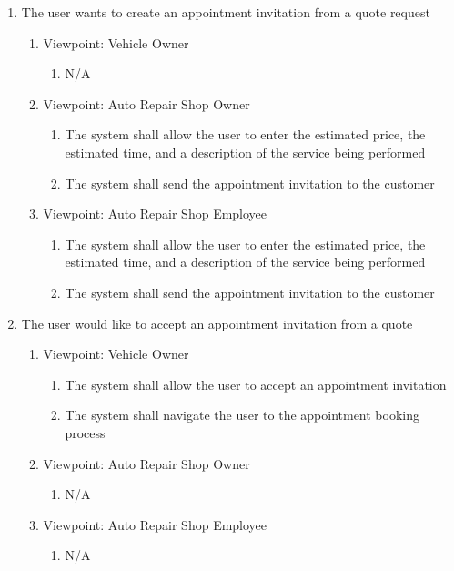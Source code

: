 \documentclass[12pt]{article}
\begin{document}
\begin{enumerate}[resume*=business_events]
	\item The user wants to create an appointment invitation from a quote request
	      \begin{enumerate}[VP\arabic*.]
		      \item Viewpoint: Vehicle Owner
		            \begin{enumerate}
			            \item[] N/A
		            \end{enumerate}
		      \item Viewpoint: Auto Repair Shop Owner
		            \begin{enumerate}
			            \item The system shall allow the user to enter the estimated price, the estimated time, and a description
			                  of the service being performed
			            \item The system shall send the appointment invitation to the customer
		            \end{enumerate}
		      \item Viewpoint: Auto Repair Shop Employee
		            \begin{enumerate}
			            \item The system shall allow the user to enter the estimated price, the estimated time, and a description
			                  of the service being performed
			            \item The system shall send the appointment invitation to the customer
		            \end{enumerate}
	      \end{enumerate}

	\item The user would like to accept an appointment invitation from a quote
	      \begin{enumerate}[VP\arabic*.]
		      \item Viewpoint: Vehicle Owner
		            \begin{enumerate}
			            \item The system shall allow the user to accept an appointment invitation
			            \item The system shall navigate the user to the appointment booking process
		            \end{enumerate}
		      \item Viewpoint: Auto Repair Shop Owner
		            \begin{enumerate}
			            \item[] N/A
		            \end{enumerate}
		      \item Viewpoint: Auto Repair Shop Employee
		            \begin{enumerate}
			            \item[] N/A
		            \end{enumerate}
	      \end{enumerate}
\end{enumerate}
\end{document}

